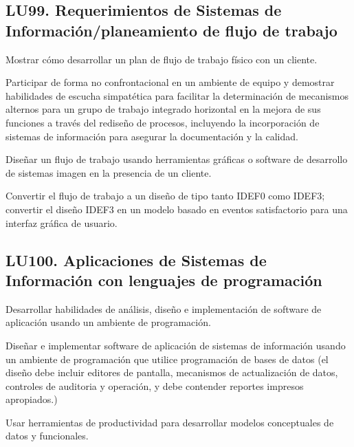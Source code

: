 \subsection{LU99. Requerimientos de Sistemas de Información/planeamiento de flujo de trabajo}\label{sec:LU99}
\begin{LearningUnit}
\begin{LUGoal}
\item Mostrar cómo desarrollar un plan de flujo de trabajo físico con un cliente.
\end{LUGoal}

\begin{LUObjective}
\item Participar de forma no confrontacional en un ambiente de equipo y demostrar habilidades de escucha simpatética para facilitar la determinación de mecanismos alternos para un grupo de trabajo integrado horizontal en la mejora de sus funciones a través del rediseño de procesos, incluyendo la incorporación de sistemas de información para asegurar la documentación y la calidad.
\item Diseñar un flujo de trabajo usando herramientas gráficas o software de desarrollo de sistemas imagen en la presencia de un cliente.
\item Convertir el flujo de trabajo a un diseño de tipo tanto IDEF0 como IDEF3; convertir el diseño IDEF3 en un modelo basado en eventos satisfactorio para una interfaz gráfica de usuario.
\end{LUObjective}
\end{LearningUnit}

\subsection{LU100. Aplicaciones de Sistemas de Información con lenguajes de programación}\label{sec:LU100}
\begin{LearningUnit}
\begin{LUGoal}
\item Desarrollar habilidades de análisis, diseño e implementación de software de aplicación usando un ambiente de programación.
\end{LUGoal}

\begin{LUObjective}
\item Diseñar e implementar software de aplicación de sistemas de información usando un ambiente de programación que utilice programación de bases de datos (el diseño debe incluir editores de pantalla, mecanismos de actualización de datos, controles de auditoria y operación, y debe contender reportes impresos apropiados.)
\item Usar herramientas de productividad para desarrollar modelos conceptuales de datos y funcionales.
\end{LUObjective}
\end{LearningUnit}


